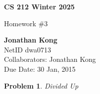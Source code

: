 \documentclass[12pt]{article}
\newtheorem{problem}{Problem}
\begin{document}
\begin{titlepage}
   \begin{center}
       \vspace*{9cm}

       \textbf{CS 212 Winter 2025}

       \vspace{0.5cm}
        Homework \#3
            
        \vfill

       \textbf{Jonathan Kong}\\
       NetID dwa0713\\
       Collaborators: Jonathan Kong\\             
       Due Date: 30 Jan, 2015
            
   \end{center}
\end{titlepage}

\pagebreak

\begin{problem}
Divided Up 
\end{problem}
\end{document}
